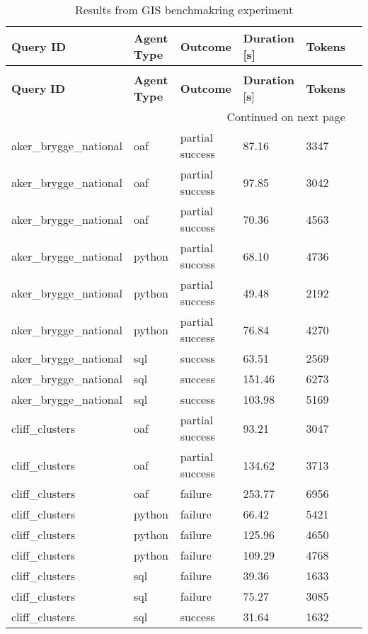 \begin{longtable}{lp{1.8cm}p{1.8cm}p{1.8cm}p{1.8cm}p{1.8cm}}
\caption{Results from GIS benchmakring experiment} \label{tbl:test-results-quantitative} \\
\toprule
\textbf{Query} \textbf{ID} & \textbf{Agent} \textbf{Type} & \textbf{Outcome} & \textbf{Duration} [\textbf{s}] & \textbf{Tokens} \\
\midrule
\endfirsthead
\caption[]{Results from GIS benchmakring experiment} \\
\toprule
\textbf{Query} \textbf{ID} & \textbf{Agent} \textbf{Type} & \textbf{Outcome} & \textbf{Duration} [\textbf{s}] & \textbf{Tokens} \\
\midrule
\endhead
\midrule
\multicolumn{5}{r}{Continued on next page} \\
\midrule
\endfoot
\bottomrule
\endlastfoot
aker\_brygge\_national & oaf & partial success & 87.16 & 3347 \\
aker\_brygge\_national & oaf & partial success & 97.85 & 3042 \\
aker\_brygge\_national & oaf & partial success & 70.36 & 4563 \\
aker\_brygge\_national & python & partial success & 68.10 & 4736 \\
aker\_brygge\_national & python & partial success & 49.48 & 2192 \\
aker\_brygge\_national & python & partial success & 76.84 & 4270 \\
aker\_brygge\_national & sql & success & 63.51 & 2569 \\
aker\_brygge\_national & sql & success & 151.46 & 6273 \\
aker\_brygge\_national & sql & success & 103.98 & 5169 \\
cliff\_clusters & oaf & partial success & 93.21 & 3047 \\
cliff\_clusters & oaf & partial success & 134.62 & 3713 \\
cliff\_clusters & oaf & failure & 253.77 & 6956 \\
cliff\_clusters & python & failure & 66.42 & 5421 \\
cliff\_clusters & python & failure & 125.96 & 4650 \\
cliff\_clusters & python & failure & 109.29 & 4768 \\
cliff\_clusters & sql & failure & 39.36 & 1633 \\
cliff\_clusters & sql & failure & 75.27 & 3085 \\
cliff\_clusters & sql & success & 31.64 & 1632 \\

\end{longtable}
